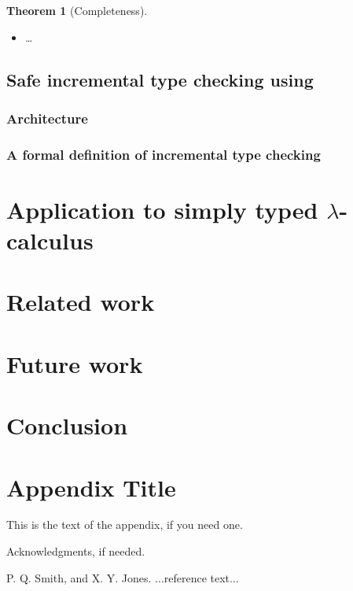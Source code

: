 \documentclass[9pt,authoryear]{sigplanconf}
\newtheorem{theorem}{Theorem}
\begin{document}
\begin{theorem}[Completeness]\ \\[-1em]
\begin{itemize}
\item \ldots
\end{itemize}
\end{theorem}

\subsection{Safe incremental type checking using {\system}}

\subsubsection{Architecture}

\subsubsection{A formal definition of incremental type checking}

\section{Application to simply typed $\lambda$-calculus}

\section{Related work}

\section{Future work}

\section{Conclusion}

\appendix
\section{Appendix Title}

This is the text of the appendix, if you need one.

\acks

Acknowledgments, if needed.





\begin{thebibliography}{}
\softraggedright

P. Q. Smith, and X. Y. Jones. ...reference text...

\end{thebibliography}
\end{document}
